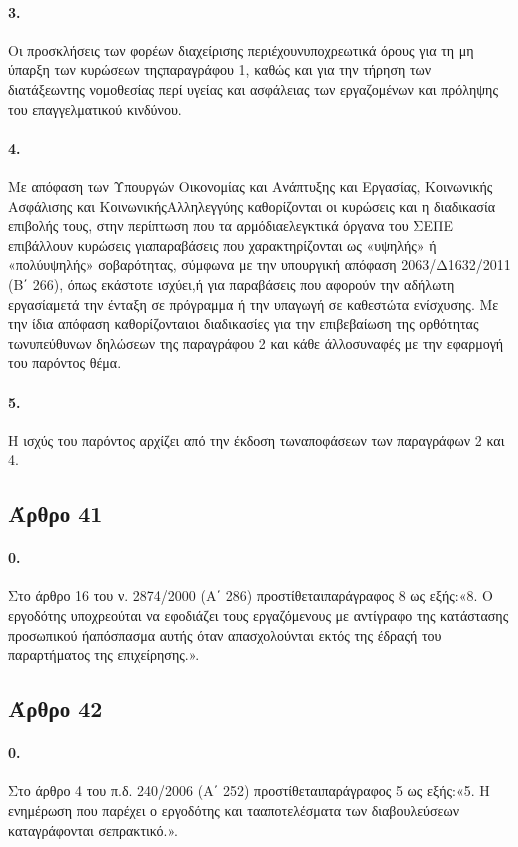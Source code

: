 \documentclass[a4paper,oneside, 10pt]{book}
\begin{document}
\paragraph { 3. } Οι προσκλήσεις των φορέων διαχείρισης περιέχουνυποχρεωτικά όρους για τη μη ύπαρξη των κυρώσεων τηςπαραγράφου 1, καθώς και για την τήρηση των διατάξεωντης νομοθεσίας περί υγείας και ασφάλειας των εργαζομένων και πρόληψης του επαγγελματικού κινδύνου.
\paragraph { 4. } Με απόφαση των Υπουργών Οικονομίας και Ανάπτυξης και Εργασίας, Κοινωνικής Ασφάλισης και ΚοινωνικήςΑλληλεγγύης καθορίζονται οι κυρώσεις και η διαδικασία επιβολής τους, στην περίπτωση που τα αρμόδιαελεγκτικά όργανα του ΣΕΠΕ επιβάλλουν κυρώσεις γιαπαραβάσεις που χαρακτηρίζονται ως «υψηλής» ή «πολύυψηλής» σοβαρότητας, σύμφωνα με την υπουργική απόφαση 2063/Δ1632/2011 (Β΄ 266), όπως εκάστοτε ισχύει,ή για παραβάσεις που αφορούν την αδήλωτη εργασίαμετά την ένταξη σε πρόγραμμα ή την υπαγωγή σε καθεστώτα ενίσχυσης. Με την ίδια απόφαση καθορίζονταιοι διαδικασίες για την επιβεβαίωση της ορθότητας τωνυπεύθυνων δηλώσεων της παραγράφου 2 και κάθε άλλοσυναφές με την εφαρμογή του παρόντος θέμα.
\paragraph { 5. } Η ισχύς του παρόντος αρχίζει από την έκδοση τωναποφάσεων των παραγράφων 2 και 4.
\subsection*{ Άρθρο 41 }
\paragraph { 0. } Στο άρθρο 16 του ν. 2874/2000 (Α΄ 286) προστίθεταιπαράγραφος 8 ως εξής:«8. Ο εργοδότης υποχρεούται να εφοδιάζει τους εργαζόμενους με αντίγραφο της κατάστασης προσωπικού ήαπόσπασμα αυτής όταν απασχολούνται εκτός της έδραςή του παραρτήματος της επιχείρησης.».
\subsection*{ Άρθρο 42 }
\paragraph { 0. } Στο άρθρο 4 του π.δ. 240/2006 (Α΄ 252) προστίθεταιπαράγραφος 5 ως εξής:«5. Η ενημέρωση που παρέχει ο εργοδότης και τααποτελέσματα των διαβουλεύσεων καταγράφονται σεπρακτικό.».
\end{document}
